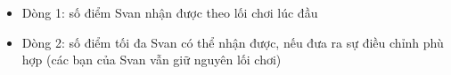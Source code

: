 \begin{itemize}
	\item Dòng 1: số điểm Svan nhận được theo lối chơi lúc đầu
	\item Dòng 2: số điểm tối đa Svan có thể nhận được, nếu đưa ra sự điều chỉnh phù hợp (các bạn của Svan vẫn giữ nguyên lối chơi)
\end{itemize}